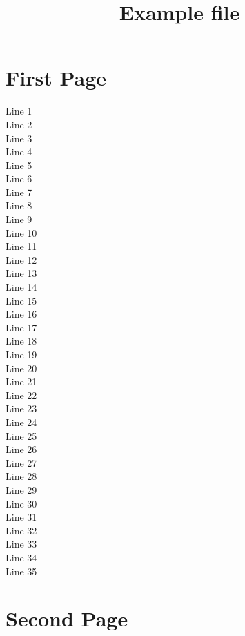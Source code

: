 \documentclass[10pt,english,a4paper,oneside]{amsart}
\begin{document}
\title{Example file}
\maketitle

\section{First Page}

Line 1 \\
Line 2 \\
Line 3 \\
Line 4 \\
Line 5 \\
Line 6 \\
Line 7 \\
Line 8 \\
Line 9 \\
Line 10 \\
Line 11 \\
Line 12 \\
Line 13 \\
Line 14 \\
Line 15 \\
Line 16 \\
Line 17 \\
Line 18 \\
Line 19 \\
Line 20 \\
Line 21 \\
Line 22 \\
Line 23 \\
Line 24 \\
Line 25 \\
Line 26 \\
Line 27 \\
Line 28 \\
Line 29 \\
Line 30 \\
Line 31 \\
Line 32 \\
Line 33 \\
Line 34 \\
Line 35 \\

\newpage

\section{Second Page}
\end{document}
